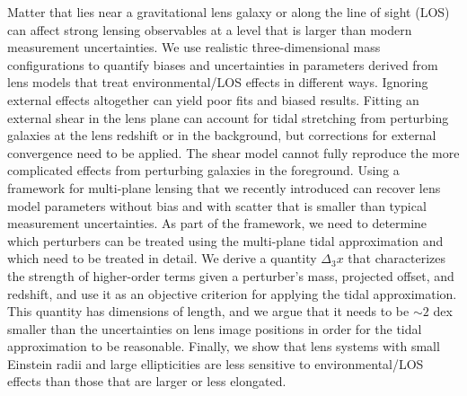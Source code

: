 Matter that lies near a gravitational lens galaxy or along the line of sight (LOS) can affect strong lensing observables at a level that is larger than modern measurement uncertainties. We use realistic three-dimensional mass configurations to quantify biases and uncertainties in parameters derived from lens models that treat environmental/LOS effects in different ways. Ignoring external effects altogether can yield poor fits and biased results. Fitting an external shear in the lens plane can account for tidal stretching from perturbing galaxies at the lens redshift or in the background, but corrections for external convergence need to be applied. The shear model cannot fully reproduce the more complicated effects from perturbing galaxies in the foreground. Using a framework for multi-plane lensing that we recently introduced \citep{McCully14} can recover lens model parameters without bias and with scatter that is smaller than typical measurement uncertainties. As part of the framework, we need to determine which perturbers can be treated using the multi-plane tidal approximation and which need to be treated in detail. We derive a quantity $\Delta_3 x$ that characterizes the strength of higher-order terms given a perturber's mass, projected offset, and redshift, and use it as an objective criterion for applying the tidal approximation. This quantity has dimensions of length, and we argue that it needs to be $\sim 2$ dex smaller than the uncertainties on lens image positions in order for the tidal approximation to be reasonable. Finally, we show that lens systems with small Einstein radii and large ellipticities are less sensitive to environmental/LOS effects than those that are larger or less elongated.